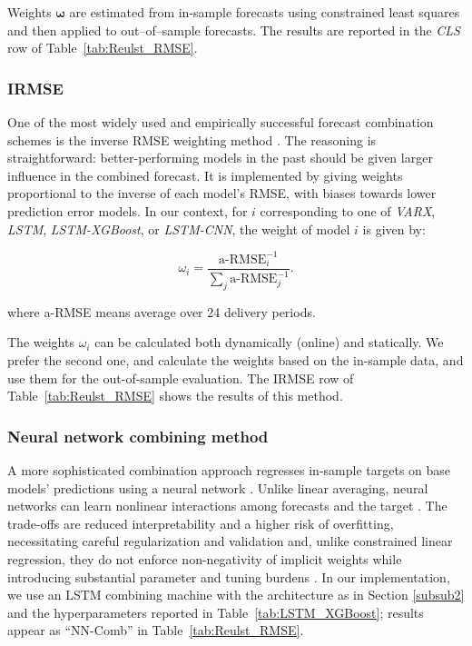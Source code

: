 \documentclass{article}
\begin{document}
Weights $\boldsymbol{\omega}$ are estimated from in-sample forecasts using constrained least squares and then applied to out–of–sample forecasts. The results are reported in the \textit{CLS} row of Table~\ref{tab:Reulst_RMSE}.


\subsubsection{IRMSE}  

One of the most widely used and empirically successful forecast combination schemes is the inverse RMSE weighting method \citep{wang2023forecast, diebold1987structural}. The reasoning is straightforward: better-performing models in the past should be given larger influence in the combined forecast. It is implemented by giving weights proportional to the inverse of each model's RMSE, with biases towards lower prediction error models. In our context, for $i$ corresponding to one of 
\textit{VARX}, \textit{LSTM}, \textit{LSTM-XGBoost}, or \textit{LSTM-CNN}, 
the weight of model $i$ is given by:


\begin{equation}
  \omega_i = \frac{\text{a-RMSE}_i^{-1}}{\sum_j \text{a-RMSE}_j^{-1}}.
\end{equation}



where a-RMSE means average over 24 delivery periods. 

The weights $\omega_i$ can be calculated both dynamically (online) and statically. We prefer the second one, and calculate the weights based on the in-sample data, and use them for the out-of-sample evaluation. The IRMSE row of Table~\ref{tab:Reulst_RMSE} shows the results of this method.

\subsubsection{Neural network combining method}  

A more sophisticated combination approach regresses in-sample targets on base models' predictions using a neural network \cite{zhang2003time}. Unlike linear averaging, neural networks can learn nonlinear interactions among forecasts and the target \cite{wang2023forecast}. The trade-offs are reduced interpretability and a higher risk of overfitting, necessitating careful regularization and validation \cite{makridakis2020m4} and, unlike constrained linear regression, they do not enforce non-negativity of implicit weights while introducing substantial parameter and tuning burdens \cite{goodfellow2016deep}. In our implementation, we use an LSTM combining machine with the architecture as in Section \ref{subsub2} and the hyperparameters reported in Table~\ref{tab:LSTM_XGBoost}; results appear as “NN-Comb” in Table~\ref{tab:Reulst_RMSE}.
\end{document}
